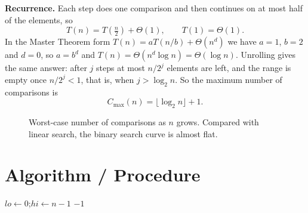 \documentclass[11pt,a4paper]{article}
\newif\ifshowguidance
\newcommand{\guidance}[1]{\ifshowguidance\begin{guidancebox}#1\end{guidancebox}\fi}
\begin{document}
\textbf{Recurrence.} Each step does one comparison and then continues on at most
half of the elements, so
\begin{equation}
T(n) = T\!\left(\tfrac{n}{2}\right) + \Theta(1),\qquad T(1)=\Theta(1).
\label{eq:rec}
\end{equation}
In the Master Theorem form $T(n)=aT(n/b)+\Theta(n^d)$ we have $a=1$, $b=2$ and
$d=0$, so $a=b^d$ and $T(n)=\Theta(n^d\log n)=\Theta(\log n)$. Unrolling gives the
same answer: after $j$ steps at most $n/2^j$ elements are left, and the range is
empty once $n/2^j<1$, that is, when $j>\log_2 n$. So the maximum number of
comparisons is
\begin{equation}
C_{\max}(n) = \lfloor \log_2 n \rfloor + 1 .
\label{eq:cmax}
\end{equation}

\begin{figure}[h]
\centering
{}
\caption{Worst-case number of comparisons as $n$ grows. Compared with linear
search, the binary search curve is almost flat.}
\label{fig:plot}
\end{figure}

\section{Algorithm / Procedure}
\guidance{Pseudocode, then a short implementation excerpt.}

\begin{algorithm}[h]
\caption{Binary Search (iterative)}
$\mathit{lo}\leftarrow 0$;\quad $\mathit{hi}\leftarrow n-1$\;
\Return $-1$\;
\end{algorithm}
\end{document}
